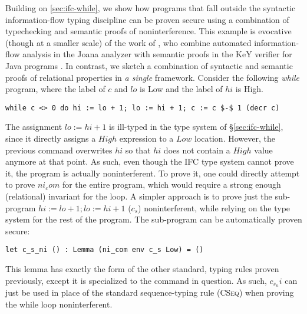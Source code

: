\documentclass[sigplan,screen]{acmart}\settopmatter{}
\newcommand{\comm}[3]{\ifcheckpagebudget\else\ifdraft{\maybecolor{#1}[#2: #3]}\fi\fi}
\newcommand{\km}[1]{\comm{purple}{KM}{#1}}
\begin{document}
Building on \autoref{sec:ifc-while}, we show how programs that fall
outside the syntactic information-flow typing discipline can be proven
secure using a combination of typechecking and
semantic proofs of noninterference. This example is evocative (though
at a smaller scale) of the work of \citet{KustersTBBKM15}, who combine
automated information-flow analysis in the Joana analyzer
\cite{HammerS09} with semantic proofs
in the KeY verifier for Java programs \cite{DarvasHS05, SchebenS11}.
In contrast, we sketch a combination of syntactic and semantic
proofs of relational properties in {\em a single} framework.
Consider the following \emph{while} program, where the label of \ls$c$
and \ls$lo$ is Low and the label of \ls$hi$ is High.
\begin{lstlisting}[language=caml]
  while c <> 0 do hi := lo + 1; lo := hi + 1; c := c $-$ 1 (decr c)
\end{lstlisting}
The assignment \ls$lo := hi + 1$ is ill-typed in the type system
of \S\ref{sec:ifc-while}, since it directly assigns a \ls$High$
expression to a \ls$Low$ location.
%
However, the previous command overwrites \ls$hi$ so that
\ls$hi$ does not contain a \ls$High$ value anymore at that point.
%
As such, even though the IFC type system cannot prove it, the program
is actually noninterferent.
%
To prove it, one could directly attempt to prove \ls$ni_com$ for the
entire program, which would require a strong enough (relational)
invariant for the loop. A simpler approach is to prove just the
sub-program \ls$hi := lo + 1; lo := hi + 1$ (\ls$c_s$) 
noninterferent, while relying on the
type system for the rest of the program.
The sub-program can be automatically proven secure:

\begin{lstlisting}
let c_s_ni () : Lemma (ni_com env c_s Low) = ()
\end{lstlisting}

\noindent This lemma has exactly the form of the other standard,
typing rules proven previously, except it is specialized to the
command in question. As such, \ls$c_s_ni$ can just be used in place
of the standard sequence-typing rule (\textsc{CSeq}) when proving the
while loop noninterferent.
\end{document}
